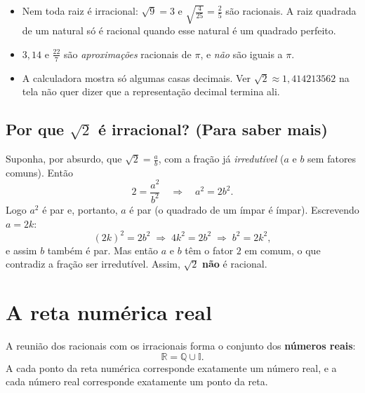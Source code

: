 \documentclass[11pt,a4paper]{article}
\begin{document}
\begin{atencao}
\begin{itemize}[nosep]
  \item Nem toda raiz é irracional: $\sqrt{9} = 3$ e $\sqrt{\frac{4}{25}} = \frac{2}{5}$ são racionais.
        A raiz quadrada de um natural só é racional quando esse natural é um quadrado perfeito.
  \item $3{,}14$ e $\frac{22}{7}$ são \emph{aproximações} racionais de $\pi$, e \emph{não} são iguais a $\pi$.
  \item A calculadora mostra só algumas casas decimais. Ver $\sqrt{2} \approx 1{,}414213562$
        na tela não quer dizer que a representação decimal termina ali.
\end{itemize}
\end{atencao}

\subsection*{Por que $\sqrt{2}$ é irracional? (Para saber mais)}

Suponha, por absurdo, que $\sqrt{2} = \frac{a}{b}$, com a fração já
\emph{irredutível} ($a$ e $b$ sem fatores comuns). Então
\[
  2 = \frac{a^2}{b^2} \quad\Longrightarrow\quad a^2 = 2b^2 .
\]
Logo $a^2$ é par e, portanto, $a$ é par (o quadrado de um ímpar é ímpar).
Escrevendo $a = 2k$:
\[
  (2k)^2 = 2b^2 \;\Longrightarrow\; 4k^2 = 2b^2 \;\Longrightarrow\; b^2 = 2k^2 ,
\]
e assim $b$ também é par. Mas então $a$ e $b$ têm o fator $2$ em comum, o que
contradiz a fração ser irredutível. Assim, $\sqrt{2}$ \textbf{não} é racional.

\section{A reta numérica real}

\begin{definicao}
A reunião dos racionais com os irracionais forma o conjunto dos
\textbf{números reais}:
\[
  \mathbb{R} = \mathbb{Q} \cup \mathbb{I}.
\]
A cada ponto da reta numérica corresponde exatamente um número real, e a cada
número real corresponde exatamente um ponto da reta.
\end{definicao}
\end{document}
